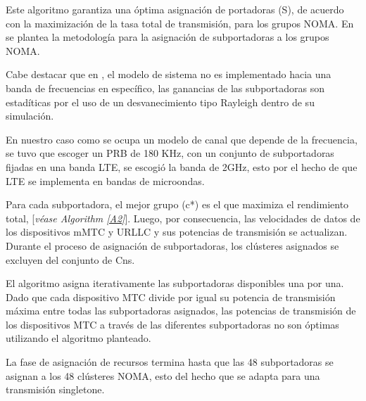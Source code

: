 Este algoritmo garantiza una óptima asignación de portadoras (S), de acuerdo con la maximización de la tasa total de transmisión, para los grupos NOMA. En \parencite{Shahini2019} se plantea la metodología para la asignación de subportadoras a los grupos NOMA. \newline

Cabe destacar que en \parencite{Shahini2019}, el modelo de sistema no es implementado hacia una banda de frecuencias en específico, las ganancias de las subportadoras son estadíticas por el uso de un desvanecimiento tipo Rayleigh dentro de su simulación.\newline

En nuestro caso como se ocupa un modelo de canal que depende de la frecuencia, se tuvo que escoger un PRB de 180 KHz, con un conjunto de subportadoras fijadas en una banda LTE, se escogió la banda de 2GHz, esto por el hecho de que LTE se implementa en bandas de microondas. \newline

Para cada subportadora, el mejor grupo (c*) es el que maximiza el rendimiento total, [\textit{véase Algorithm \ref{A2}}]. Luego, por consecuencia, las velocidades de datos de los dispositivos mMTC y URLLC y sus potencias de transmisión se actualizan. Durante el proceso de asignación de subportadoras, los clústeres asignados se excluyen del conjunto de Cns. \newline

El algoritmo asigna iterativamente las subportadoras disponibles una por una. Dado que cada dispositivo MTC divide por igual su potencia de transmisión máxima entre todas las subportadoras asignados, las potencias de transmisión de los dispositivos MTC a través de las diferentes subportadoras no son óptimas utilizando el algoritmo planteado. \newline

La fase de asignación de recursos termina hasta que las 48 subportadoras se asignan a los 48 clústeres NOMA, esto del hecho que se adapta para una transmisión singletone. \newline



